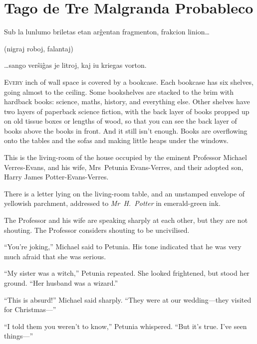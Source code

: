 \chapter{Tago de Tre Malgranda Probableco}

\begin{chapterOpeningQuote}
\noindent
Sub la lunlumo briletas etan arĝentan fragmenton, frakcion linion…

\vspace*{2ex}
(nigraj roboj, falantaj)

\vspace*{2ex}
…sango verŝiĝas je litroj, kaj iu kriegas vorton.
\end{chapterOpeningQuote}

\lettrine{E}{very} inch of wall space is covered by a bookcase. Each bookcase has six shelves, going almost to the ceiling. Some bookshelves are stacked to the brim with hardback books: science, maths, history, and everything else. Other shelves have two layers of paperback science fiction, with the back layer of books propped up on old tissue boxes\authorsnotefootnotemark{} or lengths of wood, so that you can see the back layer of books above the books in front. And it still isn’t enough. Books are overflowing onto the tables and the sofas and making little heaps under the windows.

This is the living-room of the house occupied by the eminent Professor Michael Verres-Evans, and his wife, Mrs~Petunia Evans-Verres, and their adopted son, Harry James Potter-Evans-Verres.

There is a letter lying on the living-room table, and an unstamped envelope of yellowish parchment, addressed to \emph{Mr~H.~Potter} in emerald-green ink.

The Professor and his wife are speaking sharply at each other, but they are not shouting. The Professor considers shouting to be uncivilised.

“You’re joking,” Michael said to Petunia. His tone indicated that he was very much afraid that she was serious.

“My sister was a witch,” Petunia repeated. She looked frightened, but stood her ground. “Her husband was a wizard.”

“This is absurd!” Michael said sharply. “They were at our wedding—they visited for Christmas—”

“I told them you weren’t to know,” Petunia whispered. “But it’s true. I’ve seen things—”

